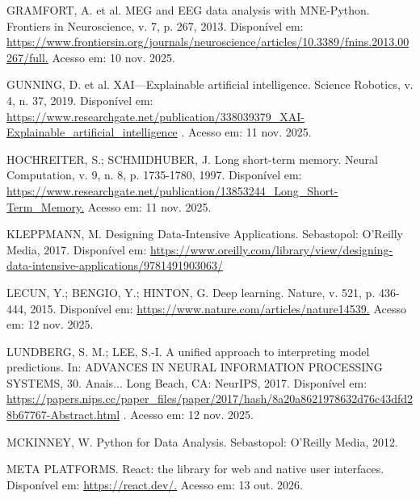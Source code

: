 \begin{SingleSpace}
{\raggedright\setlength{\parindent}{0pt} GRAMFORT, A. et al. MEG and EEG data analysis with MNE-Python. Frontiers in Neuroscience, v. 7, p. 267, 2013. Disponível em: \url{https://www.frontiersin.org/journals/neuroscience/articles/10.3389/fnins.2013.00267/full.} Acesso em: 10 nov. 2025.\par}\smallskip

{\raggedright\setlength{\parindent}{0pt} GUNNING, D. et al. XAI—Explainable artificial intelligence. Science Robotics, v. 4, n. 37, 2019. Disponível em: \url{https://www.researchgate.net/publication/338039379_XAI-Explainable_artificial_intelligence} . Acesso em: 11 nov. 2025.\par}\smallskip

{\raggedright\setlength{\parindent}{0pt} HOCHREITER, S.; SCHMIDHUBER, J. Long short-term memory. Neural Computation, v. 9, n. 8, p. 1735-1780, 1997. Disponível em: \url{https://www.researchgate.net/publication/13853244_Long_Short-Term_Memory.} Acesso em: 11 nov. 2025.\par}\smallskip

{\raggedright\setlength{\parindent}{0pt} KLEPPMANN, M. Designing Data-Intensive Applications. Sebastopol: O'Reilly Media, 2017. Disponível em: \url{https://www.oreilly.com/library/view/designing-data-intensive-applications/9781491903063/}\par}\smallskip

{\raggedright\setlength{\parindent}{0pt} LECUN, Y.; BENGIO, Y.; HINTON, G. Deep learning. Nature, v. 521, p. 436-444, 2015. Disponível em: \url{https://www.nature.com/articles/nature14539.} Acesso em: 12 nov. 2025.\par}\smallskip

{\raggedright\setlength{\parindent}{0pt} LUNDBERG, S. M.; LEE, S.-I. A unified approach to interpreting model predictions. In: ADVANCES IN NEURAL INFORMATION PROCESSING SYSTEMS, 30. Anais... Long Beach, CA: NeurIPS, 2017. Disponível em: \url{https://papers.nips.cc/paper_files/paper/2017/hash/8a20a8621978632d76c43dfd28b67767-Abstract.html} . Acesso em: 12 nov. 2025.\par}\smallskip

{\raggedright\setlength{\parindent}{0pt} MCKINNEY, W. Python for Data Analysis. Sebastopol: O'Reilly Media, 2012.\par}\smallskip

{\raggedright\setlength{\parindent}{0pt} META PLATFORMS. React: the library for web and native user interfaces. Disponível em: \url{https://react.dev/.} Acesso em: 13 out. 2026.\par}\smallskip


\end{SingleSpace}
